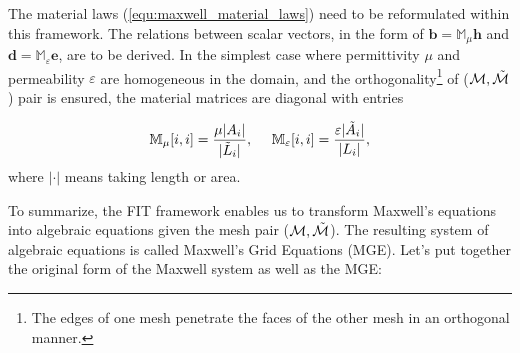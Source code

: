 \documentclass{article}
\begin{document}
The material laws (\ref{equ:maxwell_material_laws}) need to be reformulated within this framework. The relations between scalar vectors, in the form of $\mathbf{b} = \mathbb{M}_\mu \mathbf{h}$ and $\mathbf{d} = \mathbb{M}_\varepsilon \mathbf{e}$, are to be derived. In the simplest case where permittivity $\mu$ and permeability $\varepsilon$ are homogeneous in the domain, and the orthogonality\footnote{The edges of one mesh penetrate the faces of the other mesh in an orthogonal manner.} of ($\mathcal{M}, \Tilde{\mathcal{M}}$) pair is ensured, the material matrices are diagonal with entries 

\begin{equation*}
    \mathbb{M}_\mu[i,i] = \frac{\mu|A_i|}{|\Tilde{L}_i|}, \ \ \ \ \mathbb{M}_\varepsilon[i,i] = \frac{\varepsilon |\Tilde{A}_i|}{|L_i|},
\end{equation*}
where $|\cdot|$ means taking length or area.

To summarize, the FIT framework enables us to transform Maxwell’s equations into algebraic equations given the mesh pair ($\mathcal{M}, \Tilde{\mathcal{M}}$). The resulting system of algebraic equations is called Maxwell's Grid Equations (MGE). Let's put together the original form of the Maxwell system as well as the MGE:
\end{document}

